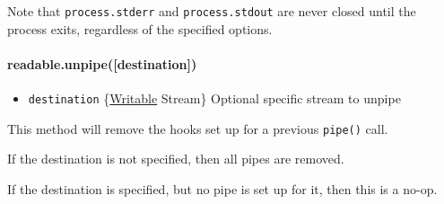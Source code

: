 \begin{Shaded}
\begin{Highlighting}[]
\NormalTok{: } \NormalTok{\});}
\NormalTok{(}\NormalTok{, }\NormalTok{() \{}
  \NormalTok{(}\NormalTok{);}
\NormalTok{\});}
\end{Highlighting}
\end{Shaded}

Note that \texttt{process.stderr} and \texttt{process.stdout} are never
closed until the process exits, regardless of the specified options.

\paragraph{readable.unpipe({[}destination{]})}\label{readable.unpipedestination}

\begin{itemize}
\itemsep1pt\parskip0pt
\item
  \texttt{destination}
  \{\hyperref[streamux5fclassux5fstreamux5fwritable]{Writable} Stream\}
  Optional specific stream to unpipe
\end{itemize}

This method will remove the hooks set up for a previous \texttt{pipe()}
call.

If the destination is not specified, then all pipes are removed.

If the destination is specified, but no pipe is set up for it, then this
is a no-op.

\begin{Shaded}
\begin{Highlighting}[]
 \NormalTok{();}
 \NormalTok{(}\NormalTok{);}
\NormalTok{(}\NormalTok{() \{}
  \NormalTok{(}\NormalTok{);}
  \NormalTok{(}\NormalTok{);}
  \NormalTok{();}
\NormalTok{\}, }\NormalTok{);}
\end{Highlighting}
\end{Shaded}


